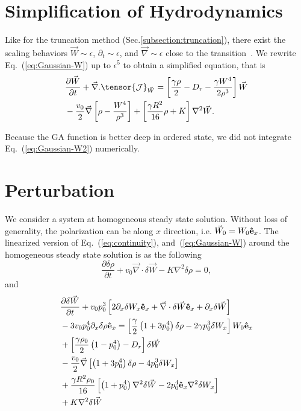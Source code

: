 \documentclass[reprint,floatfix,amsmath,amssymb,aps,pre,showkeys,showpacs,superscriptaddress]{revtex4-1}
\newcommand{\grad}{\vec{\nabla}}
\newcommand{\Dif}[2]{\frac{\partial #1}{\partial #2}}
\newcommand{\p}{p}
\newcommand{\e}{{\bf \hat{e}}}
\newcommand{\w}{W}
\newcommand{\vw}{\vec{\w}}
\newcommand{\hl}[1]{\textcolor{hlcolor}{#1}}
\newcommand{\req}[1]{Eq.~(\ref{#1})}
\newcommand{\reqs}[2]{Eq.~(\ref{#1}), and~(\ref{#2})}
\begin{document}
\appendix

\section{Simplification of Hydrodynamics}
\label{ap:simplification}

\hl{Like for the truncation} method (Sec.\ref{subsection:truncation}), there exist the scaling behaviors $\vw \sim \epsilon$, $\partial_t \sim \epsilon$, and $\grad \sim \epsilon$ close to the transition~\cite{Bertin2009}. We rewrite \req{eq:Gaussian-W} up to $\epsilon^5$ to obtain a simplified equation, that is
\begin{equation}
\begin{aligned}
&\Dif{{\vw}}{t} + \grad. \tensor{\mathcal{J}}_{\vw} = \left[ \frac{\gamma \rho}{2} - D_r - \frac{\gamma W^4}{2 \rho^3} \right] \vw \\
&- \frac{v_0}{2} \grad \left[  \rho - \frac{W^4}{\rho^3} \right] + \left[ \frac{\gamma R^2}{16} \rho + K \right] \nabla^2 \vw.
\end{aligned}
\label{eq:Gaussian-W2}
\end{equation}

Because the GA function is better deep in ordered state, we did not integrate \req{eq:Gaussian-W2} numerically. 

\section{Perturbation}
\label{ap:perturbation}

We consider a system at homogeneous steady state solution. Without loss of generality, the polarization can be along $x$ direction, i.e. $\vw_0 = \w_0 \e_x$. The linearized version of \reqs{eq:continuity}{eq:Gaussian-W} around the homogeneous steady state solution  is as the following \hl{
\begin{equation}
\Dif{\delta \rho}{t} + v_0 \grad \cdot \delta \vw - K \nabla^2 \delta \rho = 0,
\label{eq:Gaussian-drho}
\end{equation}
and
\begin{equation}
\begin{aligned}
&\Dif{\delta {\vw}}{t} + v_0 \p_0^3 \left[ 2 \partial_x \delta \w_x \e_x +  \grad \cdot \delta \vw \e_x + \partial_x \delta \vw \right] \\
&- 3 v_0 \p_0^4 \partial_x \delta \rho \e_x = \left[ \frac{\gamma}{2} \left( 1 + 3 \p_0^4 \right) \delta \rho - 2 \gamma \p_0^3 \delta \w_x \right] \w_0 \e_x \\
&+\left[ \frac{\gamma \rho_0}{2} \left( 1 - \p_0^4 \right) - D_r  \right] \delta \vw \\
&- \frac{v_0}{2} \grad \left[ \left( 1 + 3 \p_0^4 \right) \delta \rho - 4 \p_0^3 \delta \w_x \right] \\
&+ \frac{\gamma R^2 \rho_0}{16} \left[ \left( 1+\p_0^4 \right) \nabla^2 \delta \vw - 2 \p_0^4 \e_x \nabla^2 \delta \w_x \right] \\
&+ K \nabla^2 \delta \vw
\end{aligned}
\label{eq:Gaussian-dw}
\end{equation}
}
\end{document}
